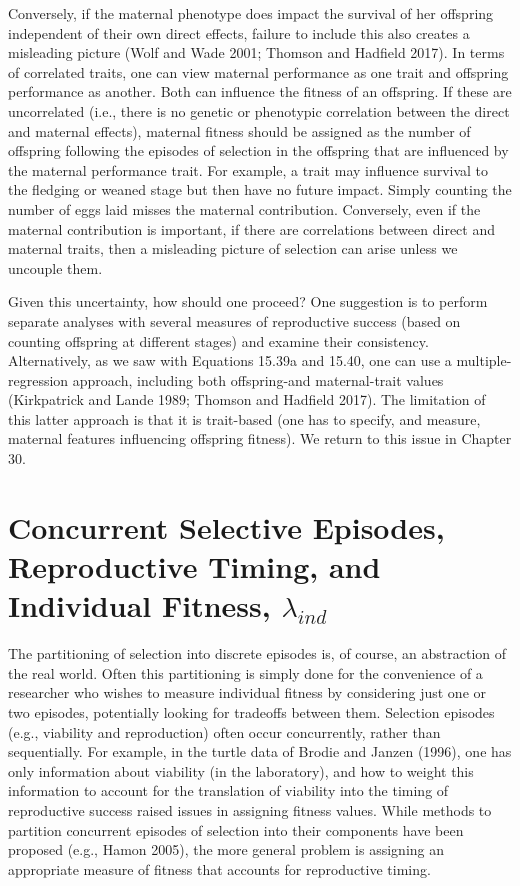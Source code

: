 \documentclass{article}
\begin{document}
Conversely, if the maternal phenotype does impact the survival of her offspring independent of their own direct effects, failure to include this also creates a misleading picture (Wolf and Wade 2001; Thomson and Hadfield 2017). In terms of correlated traits, one can view maternal performance as one trait and offspring performance as another. Both can influence the fitness of an offspring. If these are uncorrelated (i.e., there is no genetic or phenotypic correlation between the direct and maternal effects), maternal fitness should be assigned as the number of offspring following the episodes of selection in the offspring that are influenced by the maternal performance trait. For example, a trait may influence survival to the fledging or weaned stage but then have no future impact. Simply counting the number of eggs laid misses the maternal contribution. Conversely, even if the maternal contribution is important, if there are correlations between direct and maternal traits, then a misleading picture of selection can arise unless we uncouple them.

Given this uncertainty, how should one proceed? One suggestion is to perform separate analyses with several measures of reproductive success (based on counting offspring at different stages) and examine their consistency. Alternatively, as we saw with Equations 15.39a and 15.40, one can use a multiple-regression approach, including both offspring-and maternal-trait values (Kirkpatrick and Lande 1989; Thomson and Hadfield 2017). The limitation of this latter approach is that it is trait-based (one has to specify, and measure, maternal features influencing offspring fitness). We return to this issue in Chapter 30.

\section{Concurrent Selective Episodes, Reproductive Timing, and Individual Fitness,  $ \lambda_{ind} $}
The partitioning of selection into discrete episodes is, of course, an abstraction of the real world. Often this partitioning is simply done for the convenience of a researcher who wishes to measure individual fitness by considering just one or two episodes, potentially looking for tradeoffs between them. Selection episodes (e.g., viability and reproduction) often occur concurrently, rather than sequentially. For example, in the turtle data of Brodie and Janzen (1996), one has only information about viability (in the laboratory), and how to weight this information to account for the translation of viability into the timing of reproductive success raised issues in assigning fitness values. While methods to partition concurrent episodes of selection into their components have been proposed (e.g., Hamon 2005), the more general problem is assigning an appropriate measure of fitness that accounts for reproductive timing.
\end{document}

